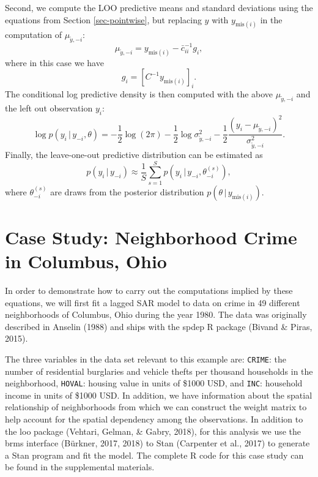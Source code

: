 \documentclass[11pt]{article}
\begin{document}
Second, we compute the LOO predictive means and standard deviations using the
equations from Section \ref{sec-pointwise}, but replacing $y$ with
$y_{\mathrm{mis}(i)}$ in the computation of $\mu_{\tilde{y},-i}$:
%
\begin{equation}
\mu_{\tilde{y},-i} = y_{{\mathrm{mis}}(i)}-\bar{c}_{ii}^{-1}g_i,
\end{equation}
%
where in this case we have
%
\begin{equation}
g_i = \left[ C^{-1} y_{\mathrm{mis}(i)} \right]_i.
\end{equation}
%
The conditional log predictive density is then computed with the above
$\mu_{\tilde{y},-i}$ and the left out observation $y_i$:
%
\begin{equation}
  \log p(y_i\,|\,y_{-i},\theta)
  = - \frac{1}{2}\log(2\pi)
  - \frac{1}{2}\log \sigma^2_{\tilde{y},-i}
  - \frac{1}{2}\frac{(y_i-\mu_{\tilde{y},-i})^2}{\sigma^2_{\tilde{y},-i}}.
\end{equation}
%
Finally, the leave-one-out predictive distribution can be estimated as
%
\begin{equation}
 p(y_i\,|\,y_{-i}) \approx \frac{1}{S} \sum_{s=1}^S p(y_i\,|\,y_{-i}, \theta_{-i}^{(s)}),
\end{equation}
%
where $\theta_{-i}^{(s)}$ are draws from the posterior distribution
$p(\theta\,|\,y_{\mathrm{mis}(i)})$.


\section{Case Study: Neighborhood Crime in Columbus, Ohio}
\label{case-study}

In order to demonstrate how to carry out the computations implied by
these equations, we will first fit a lagged SAR model to data on crime
in 49 different neighborhoods of Columbus, Ohio during the year 1980.
The data was originally described in Anselin (1988) and ships with the
spdep R package (Bivand \& Piras, 2015).

The three variables in the data set relevant to
this example are: \texttt{CRIME}: the number of residential burglaries
and vehicle thefts per thousand households in the neighborhood,
\texttt{HOVAL}: housing value in units of \$1000 USD, and \texttt{INC}:
household income in units of \$1000 USD. In addition, we have information
about the spatial relationship of neighborhoods from which we can
construct the weight matrix to help account for the spatial
dependency among the observations. 
In addition to the loo package (Vehtari, Gelman, \& Gabry, 2018), for
this analysis we use the brms interface (Bürkner, 2017, 2018) to Stan
(Carpenter et al., 2017) to generate a Stan program and fit the model.
The complete R code for this case study can be found in the supplemental materials.
\end{document}
